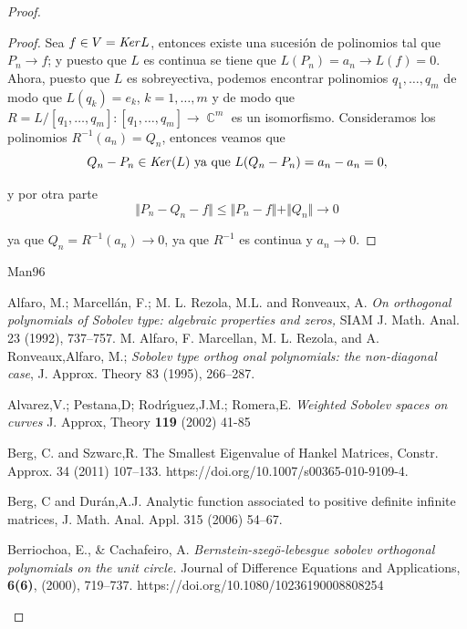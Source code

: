 \documentclass[12pt]{amsart}
\theoremstyle{definition}
\theoremstyle{plain}
\theoremstyle{remark}
\DeclareMathOperator{\CC}{\mathbb C}
\begin{document}
\begin{proof}
\begin{proof}
\noindent Sea $f\in V= {\it Ker} L$, entonces existe una sucesión de polinomios tal que $P_n \to f$; y puesto que $L$ es continua se tiene que $L(P_n)=a_n\to L(f)=0.$ 
\noindent Ahora, puesto que $L$ es sobreyectiva,  podemos encontrar polinomios $q_1,\dots,q_m$ de modo que $L(q_k)=e_k$, $k=1,\dots,m$ y de modo que $R=L/[q_1,\dots,q_m]:[q_1,\dots,q_m]\to \CC^m$ es un isomorfismo. Consideramos los polinomios $R^{-1}(a_n)=Q_n$, entonces veamos que  
$$
Q_n- P_n\in {\it Ker}(L) \text{ ya que }
L(Q_n-P_n)= a_n-a_n=0,
$$

\noindent y por otra parte
$$
\Vert P_n -Q_n -f \Vert \leq  \Vert P_n -f \Vert + \Vert  Q_n \Vert \to 0
$$ 

\noindent ya que $Q_n=R^{-1}(a_n)\to 0$, ya que $R^{-1}$ es continua y $a_n \to 0.$
\end{proof}




\begin{thebibliography}{Man96}


 Alfaro, M.; Marcell\'{a}n, F.;  M. L. Rezola, M.L. and Ronveaux, A. \emph{On orthogonal
polynomials of Sobolev type: algebraic properties and zeros,} SIAM J. Math. Anal.
23 (1992), 737–757.
 M. Alfaro, F. Marcellan, M. L. Rezola, and A. Ronveaux,Alfaro, M.; \emph{ Sobolev type orthog
onal polynomials: the non-diagonal case}, J. Approx. Theory 83 (1995), 266–287.

 Alvarez,V.; Pestana,D; Rodr\'{\i}guez,J.M.; Romera,E. \emph{Weighted Sobolev spaces on curves} J. Approx, Theory {\bf 119} (2002) 41-85



  Berg, C. and  Szwarc,R.  The Smallest Eigenvalue of Hankel Matrices, Constr. Approx. 34 (2011) 107--133. https://doi.org/10.1007/s00365-010-9109-4.

Berg, C and  Dur\'{a}n,A.J.  Analytic function associated to positive definite infinite matrices, J. Math. Anal. Appl. 315 (2006) 54--67.


 Berriochoa, E., \& Cachafeiro, A. \emph{Bernstein-szegö-lebesgue sobolev orthogonal polynomials on the unit circle.} Journal of Difference Equations and Applications, {\bf 6(6)}, (2000), 719–737. https://doi.org/10.1080/10236190008808254




\end{thebibliography}
\end{proof}
\end{document}
